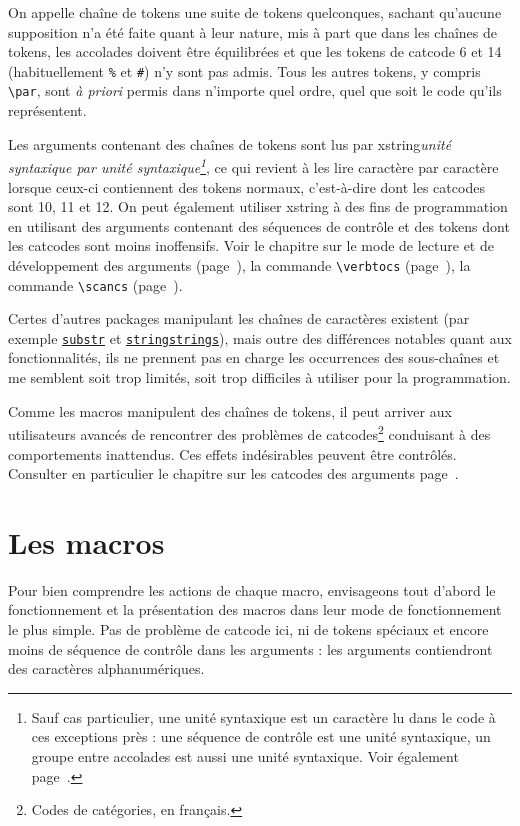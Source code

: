 \documentclass[a4paper,10pt,french]{article}
\newcommand\guill[1]{\og{}#1\fg{}}
\newcommand\US{unité syntaxique\xspace}
\newcommand\Xstring{\textsf{xstring}\xspace}
\begin{document}
On appelle \guill{chaîne de tokens} une suite de tokens quelconques, sachant qu'aucune supposition n'a été faite quant à leur nature, mis à part que dans les chaînes de tokens, les accolades doivent être équilibrées et que les tokens de catcode 6 et 14 (habituellement \verb|%| et \verb|#|) n'y sont pas admis. Tous les autres tokens, y compris \verb|\par|, sont \emph{à priori} permis dans n'importe quel ordre, quel que soit le code qu'ils représentent.\medskip

Les arguments contenant des chaînes de tokens sont lus par \Xstring \emph{\US par \US\footnote{Sauf cas particulier, une \US est un caractère lu dans le code à ces exceptions près : une séquence de contrôle est une \US, un groupe entre accolades est aussi une \US. Voir également page~\pageref{developpementarguments}.}}, ce qui revient à les lire caractère par caractère lorsque ceux-ci contiennent des tokens \guill{normaux}, c'est-à-dire dont les catcodes sont 10, 11 et 12. On peut également utiliser \Xstring à des fins de programmation en utilisant des arguments contenant des séquences de contrôle et des tokens dont les catcodes sont moins inoffensifs. Voir le chapitre sur le mode de lecture et de développement des arguments (page~\pageref{developpementarguments}), la commande \verb|\verbtocs| (page~\pageref{verbtocs}), la commande \verb|\scancs| (page~\pageref{scancs}).\medskip

Certes d'autres packages manipulant les chaînes de caractères existent (par exemple \href{http://mirror.ctan.org/tex-archive/macros/latex/contrib/substr/}{\nolinkurl{substr}} et \href{http://mirror.ctan.org/tex-archive/macros/latex/contrib/stringstrings/}{\nolinkurl{stringstrings}}), mais outre des différences notables quant aux fonctionnalités, ils ne prennent pas en charge les occurrences des sous-chaînes et me semblent soit trop limités, soit trop difficiles à utiliser pour la programmation.\medskip

Comme les macros manipulent des chaînes de tokens, il peut arriver aux utilisateurs avancés de rencontrer des problèmes de \guill{catcodes\footnote{Codes de catégories, en français.}} conduisant à des comportements inattendus. Ces effets indésirables peuvent être contrôlés. Consulter en particulier le chapitre sur les catcodes des arguments page~\pageref{macrosetoilees}.

\section{Les macros}
Pour bien comprendre les actions de chaque macro, envisageons tout d'abord le fonctionnement et la présentation des macros dans leur mode de fonctionnement le plus simple. Pas de problème de catcode ici, ni de tokens spéciaux et encore moins de séquence de contrôle dans les arguments : les arguments contiendront des caractères alphanumériques.\medskip
\end{document}
